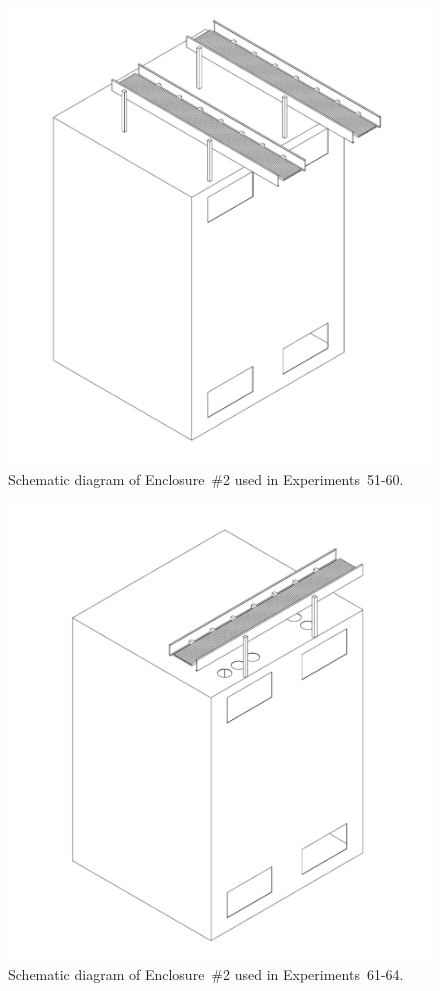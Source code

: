\begin{figure}[!ht]
\includegraphics[width=6.5in]{../FIGURES/Cabinet_2_with_Tray}
\caption[Schematic diagram of Tests 52-60]{Schematic diagram of Enclosure~\#2 used in Experiments~51-60.}
\label{fig:Cabinet_2_3D}
\end{figure}

\begin{figure}[!ht]
\includegraphics[width=6.5in]{../FIGURES/Cabinet_2_with_Tray_Holes}
\caption[Schematic diagram of Tests 61-64]{Schematic diagram of Enclosure~\#2 used in Experiments~61-64.}
\label{fig:Cabinet_2_3D_Holes}
\end{figure}



